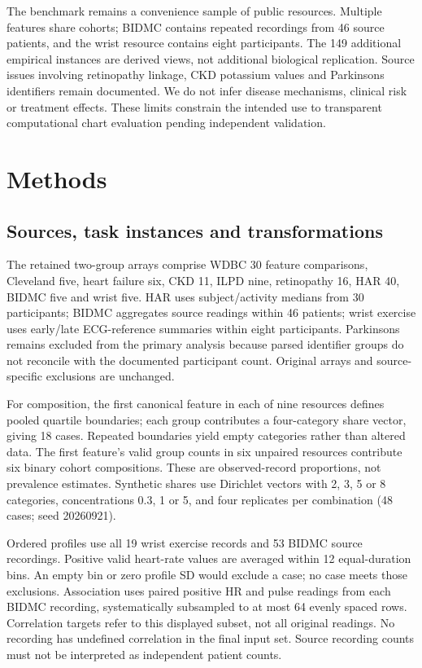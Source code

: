 \documentclass[11pt]{article}
\begin{document}
The benchmark remains a convenience sample of public resources. Multiple features share cohorts; BIDMC contains repeated recordings from 46 source patients, and the wrist resource contains eight participants. The 149 additional empirical instances are derived views, not additional biological replication. Source issues involving retinopathy linkage, CKD potassium values and Parkinsons identifiers remain documented. We do not infer disease mechanisms, clinical risk or treatment effects. These limits constrain the intended use to transparent computational chart evaluation pending independent validation.

\section*{Methods}
\subsection*{Sources, task instances and transformations}
The retained two-group arrays comprise WDBC 30 feature comparisons, Cleveland five, heart failure six, CKD 11, ILPD nine, retinopathy 16, HAR 40, BIDMC five and wrist five.\cite{wdbc,heart,failure,kidney,liver,retina,har,bidmc,wrist} HAR uses subject/activity medians from 30 participants; BIDMC aggregates source readings within 46 patients; wrist exercise uses early/late ECG-reference summaries within eight participants.\cite{pimentel2017,jarchi2017} Parkinsons remains excluded from the primary analysis because parsed identifier groups do not reconcile with the documented participant count. Original arrays and source-specific exclusions are unchanged.

For composition, the first canonical feature in each of nine resources defines pooled quartile boundaries; each group contributes a four-category share vector, giving 18 cases. Repeated boundaries yield empty categories rather than altered data. The first feature's valid group counts in six unpaired resources contribute six binary cohort compositions. These are observed-record proportions, not prevalence estimates. Synthetic shares use Dirichlet vectors with 2, 3, 5 or 8 categories, concentrations 0.3, 1 or 5, and four replicates per combination (48 cases; seed 20260921).

Ordered profiles use all 19 wrist exercise records and 53 BIDMC source recordings. Positive valid heart-rate values are averaged within 12 equal-duration bins. An empty bin or zero profile SD would exclude a case; no case meets those exclusions. Association uses paired positive HR and pulse readings from each BIDMC recording, systematically subsampled to at most 64 evenly spaced rows. Correlation targets refer to this displayed subset, not all original readings. No recording has undefined correlation in the final input set. Source recording counts must not be interpreted as independent patient counts.
\end{document}
